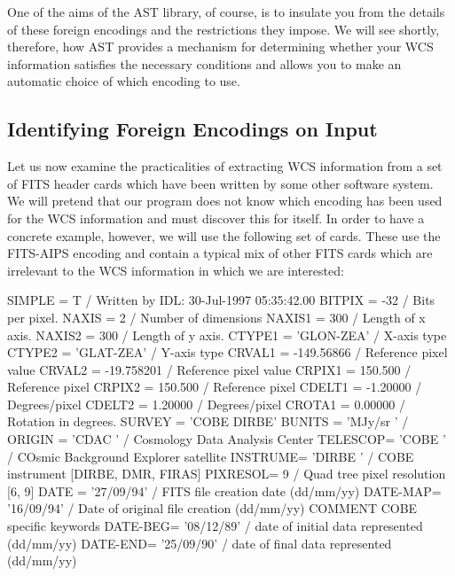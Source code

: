 \documentclass[twoside,11pt]{starlink}
\begin{document}
One of the aims of the AST library, of course, is to insulate you from
the details of these foreign encodings and the restrictions they
impose. We will see shortly, therefore, how AST provides a mechanism
for determining whether your WCS information satisfies the necessary
conditions and allows you to make an automatic choice of which
encoding to use.

\subsection{\label{ss:identifyingfitsencoding}Identifying Foreign Encodings on Input}

Let us now examine the practicalities of extracting WCS information
from a set of FITS header cards which have been written by some other
software system. We will pretend that our program does not know which
encoding has been used for the WCS information and must discover this
for itself. In order to have a concrete example, however, we will use
the following set of cards. These use the FITS-AIPS encoding and
contain a typical mix of other FITS cards which are irrelevant to the
WCS information in which we are interested:

\small
\begin{terminalv}
SIMPLE  =                    T / Written by IDL:  30-Jul-1997 05:35:42.00
BITPIX  =                  -32 / Bits per pixel.
NAXIS   =                    2 / Number of dimensions
NAXIS1  =                  300 / Length of x axis.
NAXIS2  =                  300 / Length of y axis.
CTYPE1  = 'GLON-ZEA'           / X-axis type
CTYPE2  = 'GLAT-ZEA'           / Y-axis type
CRVAL1  =           -149.56866 / Reference pixel value
CRVAL2  =           -19.758201 / Reference pixel value
CRPIX1  =              150.500 / Reference pixel
CRPIX2  =              150.500 / Reference pixel
CDELT1  =             -1.20000 / Degrees/pixel
CDELT2  =              1.20000 / Degrees/pixel
CROTA1  =              0.00000 / Rotation in degrees.
SURVEY  = 'COBE DIRBE'
BUNITS  = 'MJy/sr  '           /
ORIGIN  = 'CDAC    '           / Cosmology Data Analysis Center
TELESCOP= 'COBE    '           / COsmic Background Explorer satellite
INSTRUME= 'DIRBE   '           / COBE instrument [DIRBE, DMR, FIRAS]
PIXRESOL=                    9 / Quad tree pixel resolution [6, 9]
DATE    = '27/09/94'           / FITS file creation date (dd/mm/yy)
DATE-MAP= '16/09/94'           / Date of original file creation (dd/mm/yy)
COMMENT     COBE specific keywords
DATE-BEG= '08/12/89'           / date of initial data represented (dd/mm/yy)
DATE-END= '25/09/90'           / date of final data represented   (dd/mm/yy)
\end{terminalv}
\normalsize
\end{document}
